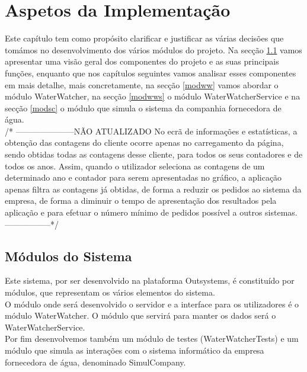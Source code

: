 \chapter{Aspetos da Implementação} \label{cap:implementacao}
Este capítulo tem como propósito clarificar e justificar as várias decisões que tomámos no desenvolvimento dos vários módulos do projeto. Na secção \ref{mods} vamos apresentar uma visão geral dos componentes do projeto e as suas principais funções, enquanto que nos capítulos seguintes vamos analisar esses componentes em mais detalhe, mais concretamente, na secção \ref{modww} vamos abordar o módulo WaterWatcher, na secção \ref{modwws} o módulo WaterWatcherService e na secção \ref{modsc} o módulo que simula o sistema da companhia fornecedora de água.\\

/* ---------------------NÃO ATUALIZADO
No ecrã de informações e estatísticas, a obtenção das contagens do cliente ocorre apenas no carregamento da página, sendo obtidas todas as contagens desse cliente, para todos os seus contadores e de todos os anos. Assim, quando o utilizador seleciona as contagens de um determinado ano e contador para serem apresentadas no gráfico, a aplicação apenas filtra as contagens já obtidas, de forma a reduzir os pedidos ao sistema da empresa, de forma a diminuir o tempo de apresentação dos resultados pela aplicação e para efetuar o número mínimo de pedidos possível a outros sistemas.
-----------------*/

\section{Módulos do Sistema} \label{mods} %
Este sistema, por ser desenvolvido na plataforma Outsystems, é constituído por módulos, que representam os vários elementos do sistema.\\
O módulo onde será desenvolvido o servidor e a interface para os utilizadores é o módulo WaterWatcher. O módulo que servirá para manter os dados será o WaterWatcherService.\\
Por fim desenvolvemos também um módulo de testes (WaterWatcherTests) e um módulo que simula as interações com o sistema informático da empresa fornecedora de água, denominado SimulCompany.

